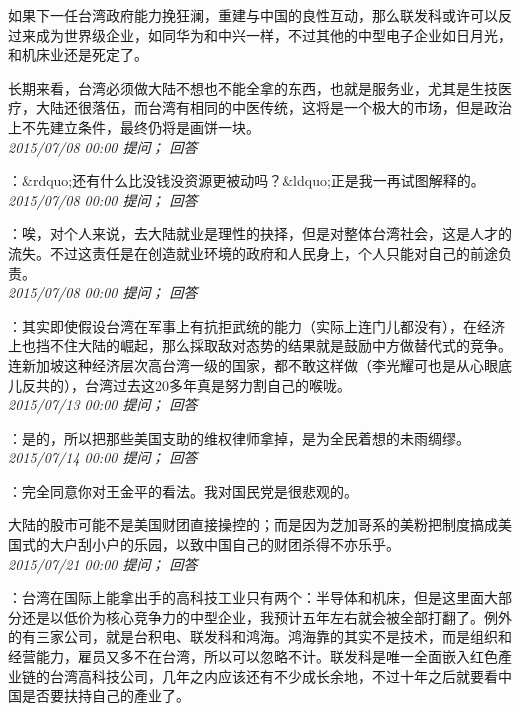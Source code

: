 \documentclass[twocolumn]{ctexart}
\begin{document}
如果下一任台湾政府能力挽狂澜，重建与中国的良性互动，那么联发科或许可以反过来成为世界级企业，如同华为和中兴一样，不过其他的中型电子企业如日月光，和机床业还是死定了。

长期来看，台湾必须做大陆不想也不能全拿的东西，也就是服务业，尤其是生技医疗，大陆还很落伍，而台湾有相同的中医传统，这将是一个极大的市场，但是政治上不先建立条件，最终仍将是画饼一块。\\

\textit{\hfill\noindent\small 2015/07/08 00:00 提问； 回答}

：\&rdquo;还有什么比没钱没资源更被动吗？\&ldquo;正是我一再试图解释的。\\

\textit{\hfill\noindent\small 2015/07/08 00:00 提问； 回答}

：唉，对个人来说，去大陆就业是理性的抉择，但是对整体台湾社会，这是人才的流失。不过这责任是在创造就业环境的政府和人民身上，个人只能对自己的前途负责。\\

\textit{\hfill\noindent\small 2015/07/08 00:00 提问； 回答}

：其实即使假设台湾在军事上有抗拒武统的能力（实际上连门儿都没有），在经济上也挡不住大陆的崛起，那么採取敌对态势的结果就是鼓励中方做替代式的竞争。连新加坡这种经济层次高台湾一级的国家，都不敢这样做（李光耀可也是从心眼底儿反共的），台湾过去这20多年真是努力割自己的喉咙。\\

\textit{\hfill\noindent\small 2015/07/13 00:00 提问； 回答}

：是的，所以把那些美国支助的维权律师拿掉，是为全民着想的未雨绸缪。\\

\textit{\hfill\noindent\small 2015/07/14 00:00 提问； 回答}

：完全同意你对王金平的看法。我对国民党是很悲观的。

大陆的股市可能不是美国财团直接操控的；而是因为芝加哥系的美粉把制度搞成美国式的大户刮小户的乐园，以致中国自己的财团杀得不亦乐乎。\\

\textit{\hfill\noindent\small 2015/07/21 00:00 提问； 回答}

：台湾在国际上能拿出手的高科技工业只有两个：半导体和机床，但是这里面大部分还是以低价为核心竞争力的中型企业，我预计五年左右就会被全部打翻了。例外的有三家公司，就是台积电、联发科和鸿海。鸿海靠的其实不是技术，而是组织和经营能力，雇员又多不在台湾，所以可以忽略不计。联发科是唯一全面嵌入红色產业链的台湾高科技公司，几年之内应该还有不少成长余地，不过十年之后就要看中国是否要扶持自己的產业了。
\end{document}

